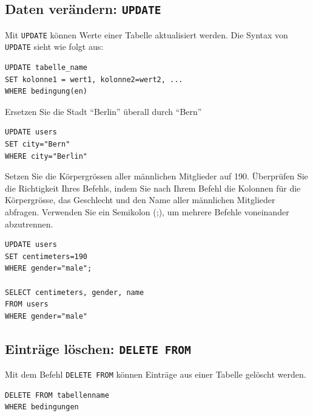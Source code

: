 \subsection{Daten verändern: \texorpdfstring{\lstinline[style=sql]|UPDATE|}{UPDATE}}

Mit \lstinline[style=sql]|UPDATE| können Werte einer Tabelle aktualisiert werden. Die Syntax von \lstinline[style=sql]|UPDATE| sieht wie folgt aus:

\begin{lstlisting}[style=sql]
UPDATE tabelle_name
SET kolonne1 = wert1, kolonne2=wert2, ...
WHERE bedingung(en)
\end{lstlisting}

\begin{myexercise}\label{aufgabe:evalPoly}

  Ersetzen Sie die Stadt ``Berlin'' überall durch ``Bern''
  \begin{myanswer}
    \begin{lstlisting}[style=sql]
UPDATE users
SET city="Bern"
WHERE city="Berlin"
\end{lstlisting}
  \end{myanswer}
\end{myexercise}

\begin{mysubmission}
  Setzen Sie die Körpergrössen aller männlichen Mitglieder auf 190. Überprüfen Sie die Richtigkeit Ihres Befehls, indem Sie nach Ihrem Befehl die Kolonnen für die Körpergrösse, das Geschlecht und den Name aller männlichen Mitglieder abfragen. Verwenden Sie ein Semikolon (;), um mehrere Befehle voneinander abzutrennen.
  \begin{myanswer}
    \begin{lstlisting}[style=sql]
UPDATE users
SET centimeters=190
WHERE gender="male"; 

SELECT centimeters, gender, name
FROM users
WHERE gender="male"
\end{lstlisting}
  \end{myanswer}
\end{mysubmission}

\subsection{Einträge löschen: \texorpdfstring{\lstinline[style=sql]|DELETE FROM|}{DELETE FROM}}
Mit dem Befehl \lstinline[style=sql]|DELETE FROM| können Einträge aus einer Tabelle gelöscht werden.
\begin{lstlisting}[style=sql]
DELETE FROM tabellenname
WHERE bedingungen
\end{lstlisting}

